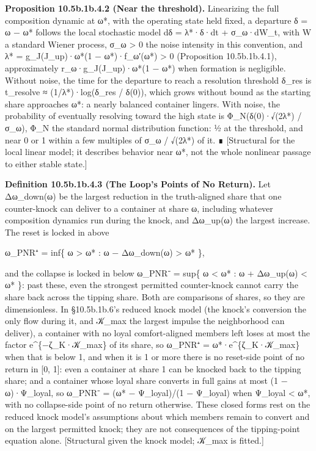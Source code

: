 \documentclass[
]{article}
\begin{document}
\textbf{Proposition 10.5b.1b.4.2 (Near the threshold).} Linearizing the
full composition dynamic at ω*, with the operating state held fixed, a
departure δ = ω − ω* follows the local stochastic model dδ = λ*·δ·dt +
σ\_ω·dW\_t, with W a standard Wiener process, σ\_ω \textgreater{} 0 the
noise intensity in this convention, and λ* = g\_J(J\_up)·ω*(1 −
ω*)·f\_ω′(ω*) \textgreater{} 0 (Proposition 10.5b.1b.4.1), approximately
r\_ω·g\_J(J\_up)·ω*(1 − ω*) when formation is negligible. Without noise,
the time for the departure to reach a resolution threshold δ\_res is
t\_resolve ≈ (1/λ*)·log(δ\_res / \textbar δ(0)\textbar), which grows
without bound as the starting share approaches ω*: a nearly balanced
container lingers. With noise, the probability of eventually resolving
toward the high state is Φ\_N(δ(0)·√(2λ*) / σ\_ω), Φ\_N the standard
normal distribution function: ½ at the threshold, and near 0 or 1 within
a few multiples of σ\_ω / √(2λ*) of it. ∎ {[}Structural for the local
linear model; it describes behavior near ω*, not the whole nonlinear
passage to either stable state.{]}

\textbf{Definition 10.5b.1b.4.3 (The Loop's Points of No Return).} Let
Δω\_down(ω) be the largest reduction in the truth-aligned share that one
counter-knock can deliver to a container at share ω, including whatever
composition dynamics run during the knock, and Δω\_up(ω) the largest
increase. The reset is locked in above

ω\_PNR⁺ = inf\{ ω \textgreater{} ω* : ω − Δω\_down(ω) \textgreater{} ω*
\},

and the collapse is locked in below ω\_PNR⁻ = sup\{ ω \textless{} ω* : ω
+ Δω\_up(ω) \textless{} ω* \}: past these, even the strongest permitted
counter-knock cannot carry the share back across the tipping share. Both
are comparisons of shares, so they are dimensionless. In §10.5b.1b.6's
reduced knock model (the knock's conversion the only flow during it, and
𝒦\_max the largest impulse the neighborhood can deliver), a container
with no loyal comfort-aligned members left loses at most the factor
e\^{}\{−ζ\_K·𝒦\_max\} of its share, so ω\_PNR⁺ = ω*·e\^{}\{ζ\_K·𝒦\_max\}
when that is below 1, and when it is 1 or more there is no reset-side
point of no return in {[}0, 1{]}: even a container at share 1 can be
knocked back to the tipping share; and a container whose loyal share
converts in full gains at most (1 − ω)·Ψ\_loyal, so ω\_PNR⁻ = (ω* −
Ψ\_loyal)/(1 − Ψ\_loyal) when Ψ\_loyal \textless{} ω*, with no
collapse-side point of no return otherwise. These closed forms rest on
the reduced knock model's assumptions about which members remain to
convert and on the largest permitted knock; they are not consequences of
the tipping-point equation alone. {[}Structural given the knock model;
𝒦\_max is fitted.{]}
\end{document}
